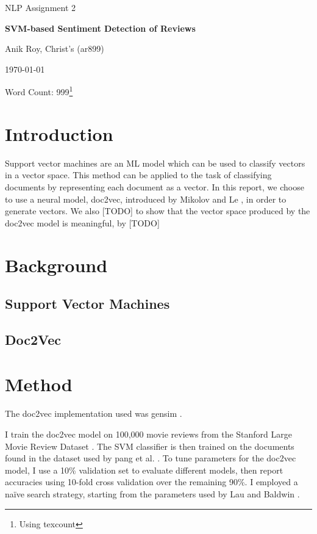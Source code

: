 \documentclass[12pt,a4paper]{article}
\begin{document}
\centerline{\large NLP Assignment 2}
\vspace{0.2in}
\centerline{\Large\bf SVM-based Sentiment Detection of Reviews}
\vspace{0.1in}
\centerline{\large {Anik Roy, Christ's (ar899)}}
\vspace{0.1in}
\centerline{\large {\today}}
\vspace{0.05in}
\centerline{Word Count: 999\footnote{Using texcount}}
\vspace{0.2in}


\begin{multicols}{2}
  
\section{Introduction}

Support vector machines are an ML model which can be used to classify vectors in a vector space. This method can be applied to the task of classifying documents by representing each document as a vector. In this report, we choose to use a neural model, doc2vec, introduced by Mikolov and Le \cite{}, in order to generate vectors. We also [TODO] to show that the vector space produced by the doc2vec model is meaningful, by [TODO]

\section{Background}

\subsection{Support Vector Machines}

\subsection{Doc2Vec}



\section{Method}

The doc2vec implementation used was gensim \cite{gensim}.

I train the doc2vec model on 100,000 movie reviews from the Stanford Large Movie Review Dataset \cite{maas-EtAl:2011:ACL-HLT2011}. The SVM classifier is then trained on the documents found in the dataset used by pang et al. \cite{pang2002thumbs}. To tune parameters for the doc2vec model, I use a 10\% validation set to evaluate different models, then report accuracies using 10-fold cross validation over the remaining 90\%. I employed a naïve search strategy, starting from the parameters used by Lau and Baldwin \cite{lau2016empirical}.




\end{multicols}
\end{document}
